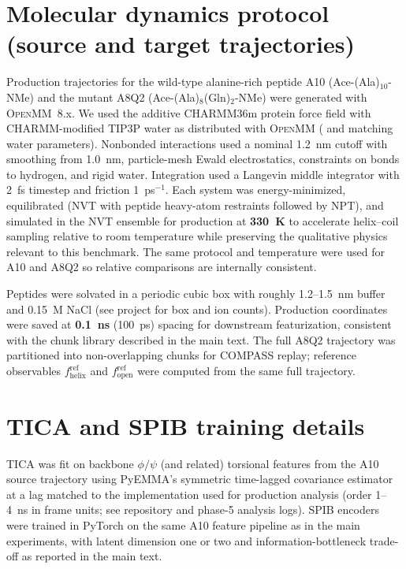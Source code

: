 
\chapter{Molecular dynamics protocol (source and target trajectories)}

Production trajectories for the wild-type alanine-rich peptide A10 (Ace-(Ala)$_{10}$-NMe) and the mutant A8Q2 (Ace-(Ala)$_8$(Gln)$_2$-NMe) were generated with \textsc{OpenMM}~8.x.\cite{eastman2024openmm8}
We used the additive CHARMM36m protein force field with CHARMM-modified TIP3P water as distributed with \textsc{OpenMM} ( and matching water parameters).\cite{huang2017charmm36m,kim2015charmmgui}
Nonbonded interactions used a nominal 1.2~nm cutoff with smoothing from 1.0~nm, particle-mesh Ewald electrostatics, constraints on bonds to hydrogen, and rigid water.
Integration used a Langevin middle integrator with 2~fs timestep and friction 1~ps$^{-1}$.
Each system was energy-minimized, equilibrated (NVT with peptide heavy-atom restraints followed by NPT), and simulated in the NVT ensemble for production at \textbf{330~K} to accelerate helix--coil sampling relative to room temperature while preserving the qualitative physics relevant to this benchmark.
The same protocol and temperature were used for A10 and A8Q2 so relative comparisons are internally consistent.

Peptides were solvated in a periodic cubic box with roughly 1.2--1.5~nm buffer and 0.15~M NaCl (see project  for box and ion counts).
Production coordinates were saved at \textbf{0.1~ns} (100~ps) spacing for downstream featurization, consistent with the chunk library described in the main text.
The full A8Q2 trajectory was partitioned into non-overlapping chunks for COMPASS replay; reference observables $f_{\mathrm{helix}}^{\mathrm{ref}}$ and $f_{\mathrm{open}}^{\mathrm{ref}}$ were computed from the same full trajectory.

\chapter{TICA and SPIB training details}

TICA was fit on backbone $\phi/\psi$ (and related) torsional features from the A10 source trajectory using PyEMMA's symmetric time-lagged covariance estimator at a lag matched to the implementation used for production analysis (order 1--4~ns in frame units; see repository  and phase-5 analysis logs).
SPIB encoders were trained in PyTorch on the same A10 feature pipeline as in the main experiments, with latent dimension one or two and information-bottleneck trade-off as reported in the main text.


